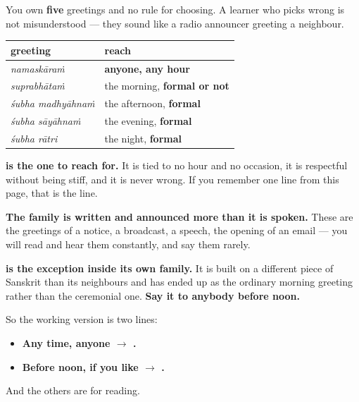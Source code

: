 \begin{grammarlens}[title={Grammar Lens: the rule nobody told you}]
You own \textbf{five} greetings and no rule for choosing. A learner who picks wrong is not misunderstood — they sound like a radio announcer greeting a neighbour.

\noindent
\begin{tabularx}{\linewidth}{@{}>{\raggedright\arraybackslash}X>{\raggedright\arraybackslash}X@{}}
\toprule
\textbf{greeting} & \textbf{reach} \\
\midrule
\textbf{\ml{നമസ്കാരം}} \emph{namaskāraṁ} & \textbf{anyone, any hour} \\
\textbf{\ml{സുപ്രഭാതം}} \emph{suprabhātaṁ} & the morning, \textbf{formal or not} \\
\textbf{\ml{ശുഭ} \ml{മധ്യാഹ്നം}} \emph{śubha madhyāhnaṁ} & the afternoon, \textbf{formal} \\
\textbf{\ml{ശുഭ} \ml{സായാഹ്നം}} \emph{śubha sāyāhnaṁ} & the evening, \textbf{formal} \\
\textbf{\ml{ശുഭ} \ml{രാത്രി}} \emph{śubha rātri} & the night, \textbf{formal} \\
\bottomrule
\end{tabularx}

\textbf{ is the one to reach for.} It is tied to no hour and no occasion, it is respectful without being stiff, and it is never wrong. If you remember one line from this page, that is the line.

\textbf{The  family is written and announced more than it is spoken.} These are the greetings of a notice, a broadcast, a speech, the opening of an email — you will read and hear them constantly, and say them rarely.

\textbf{ is the exception inside its own family.} It is built on a different piece of Sanskrit than its neighbours and has ended up as the ordinary morning greeting rather than the ceremonial one. \textbf{Say it to anybody before noon.}

So the working version is two lines:

\begin{itemize}
\raggedright
  \item \textbf{Any time, anyone $\to$ .}
  \item \textbf{Before noon, if you like $\to$ .}
\end{itemize}

And the others are for reading.
\end{grammarlens}


